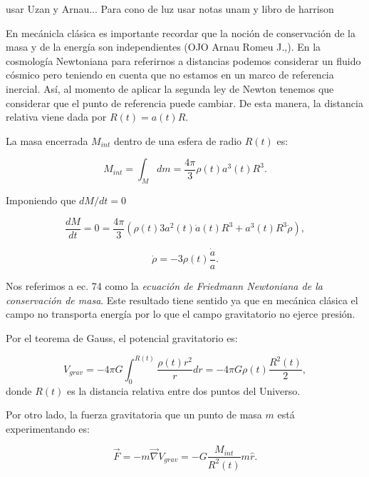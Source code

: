 \documentclass{article}
\begin{document}
   usar Uzan y Arnau...
    Para cono de luz usar notas unam y libro de harrison 
    
    En mecánicla clásica es importante recordar que la noción de conservación de la masa y de la energía son independientes (OJO {Arnau Romeu J.,)}. En la cosmología Newtoniana para referirnos a distancias podemos considerar un fluido cósmico pero teniendo en cuenta que no estamos en un marco de referencia inercial. Así, al momento de aplicar la segunda ley de Newton tenemos que considerar que el punto de referencia puede cambiar. De esta manera, la distancia relativa viene dada por $R(t) = a(t) R$.
    
    La masa  encerrada $M_{int}$ dentro de una esfera de radio $R(t)$ es: 
    
    \begin{equation}
        M_{int} = \int_M{dm} = \frac{4\pi}{3} \rho(t) a^3(t) R^3.
    \end{equation}
    
    Imponiendo que $dM/dt=0$
    
    \[
    \frac{dM}{dt}   = 0 =  \frac{4\pi}{3} \left( \rho(t)3 a^2(t) \dot{a}(t)  R^3 + a^3(t) R^3 \dot{\rho} \right), \]
    
    \begin{equation}
        \boxed{\dot{\rho} = -3 \rho(t) \frac{\dot{a}}{a}.}
    \end{equation}
     
    Nos referimos a ec. 74 como la {\textit{ecuación de Friedmann Newtoniana de la conservación de masa}}. Este resultado tiene sentido ya que en mecánica clásica el campo no transporta energía por lo que el campo gravitatorio no ejerce presión. 
    
    
    Por el teorema de Gauss, el potencial gravitatorio es: 
    
    \begin{equation}
        V_{grav} = -4 \pi G \int_0^{R(t)}{\frac{\rho(t)r^2}{r}dr} = -4 \pi G \rho(t) \frac{R^2(t)}{2},
    \end{equation}
    donde $R(t)$ es la distancia relativa entre dos puntos del Universo. 
    
    
    Por otro lado, la fuerza gravitatoria que un punto de masa $m$ está experimentando es: 
    
    \begin{equation}
        \vec{F} = -m \vec{\nabla} V_{grav} = - G \frac{M_{int}}{R^2(t)} m \hat{r}.
    \end{equation}
    
\end{document}
